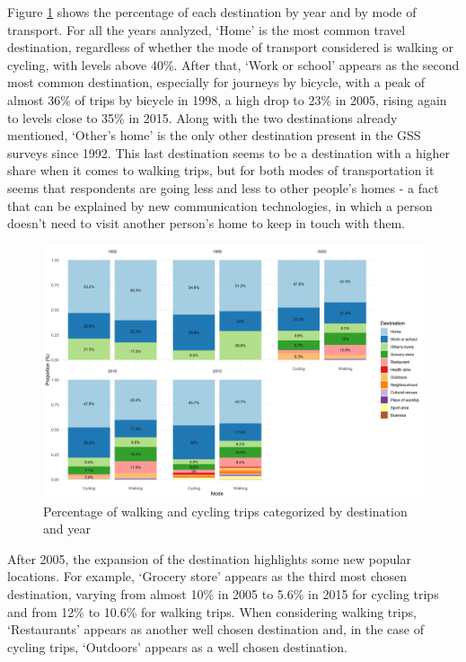 \documentclass[preprint, 3p,
authoryear]{elsarticle} %
\begin{document}
Figure \ref{fig:figure-destmodeyearperc} shows the percentage of each
destination by year and by mode of transport. For all the years
analyzed, `Home' is the most common travel destination, regardless of
whether the mode of transport considered is walking or cycling, with
levels above 40\%. After that, `Work or school' appears as the second
most common destination, especially for journeys by bicycle, with a peak
of almost 36\% of trips by bicycle in 1998, a high drop to 23\% in 2005,
rising again to levels close to 35\% in 2015. Along with the two
destinations already mentioned, `Other's home' is the only other
destination present in the GSS surveys since 1992. This last destination
seems to be a destination with a higher share when it comes to walking
trips, but for both modes of transportation it seems that respondents
are going less and less to other people's homes - a fact that can be
explained by new communication technologies, in which a person doesn't
need to visit another person's home to keep in touch with them.

\begin{figure}
\includegraphics[width=1\linewidth]{figures/destination_percentual} \caption{Percentage of walking and cycling trips categorized by destination and year}\label{fig:figure-destmodeyearperc}
\end{figure}

After 2005, the expansion of the destination highlights some new popular
locations. For example, `Grocery store' appears as the third most chosen
destination, varying from almost 10\% in 2005 to 5.6\% in 2015 for
cycling trips and from 12\% to 10.6\% for walking trips. When
considering walking trips, `Restaurants' appears as another well chosen
destination and, in the case of cycling trips, `Outdoors' appears as a
well chosen destination.
\end{document}
